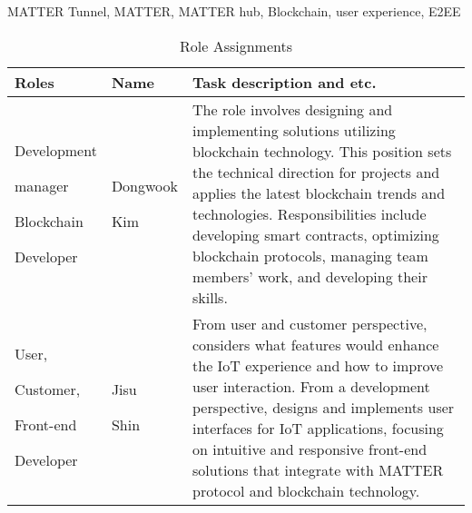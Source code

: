 \documentclass[conference]{IEEEtran}
\begin{document}
\begin{IEEEkeywords}
MATTER Tunnel, MATTER, MATTER hub, Blockchain, user experience, E2EE
\end{IEEEkeywords}

\begin{table}[h]
\caption{Role Assignments}
\def\arraystretch{1.24} \small
    \begin{tabular}{|p{1.8cm}|p{1.4cm}|p{4.4cm}|}
        \hline
         Roles & Name & Task description and etc. \\ \hline
         
         Development \par manager \par Blockchain \par Developer & Dongwook \par Kim & The role involves designing and implementing solutions utilizing blockchain technology. This position sets the technical direction for projects and applies the latest blockchain trends and technologies. Responsibilities include developing smart contracts, optimizing blockchain protocols, managing team members' work, and developing their skills.\\ \hline

         User, \par Customer, \par Front-end \par Developer & Jisu \par Shin & From user and customer perspective, considers what features would enhance the IoT experience and how to improve user interaction. From a development perspective, designs and implements user interfaces for IoT applications, focusing on intuitive and responsive front-end solutions that integrate with MATTER protocol and blockchain technology.\\ \hline
        
    \end{tabular}
\end{table}

\needspace{10cm}
\end{document}
